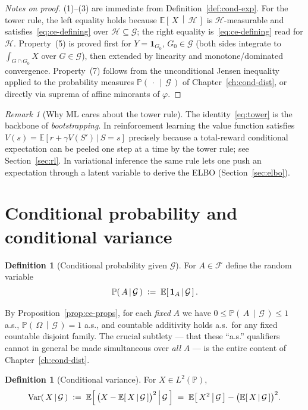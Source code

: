 \documentclass[11pt,oneside]{report}
\theoremstyle{plain}
\theoremstyle{definition}
\newtheorem{definition}[theorem]{Definition}
\theoremstyle{remark}
\newtheorem{remark}[theorem]{Remark}
\newcommand{\Prob}{\mathbb{P}}
\newcommand{\E}{\mathbb{E}}
\newcommand{\one}{\mathbf{1}}                 %
\newcommand{\Fcal}{\mathcal{F}}
\newcommand{\Gcal}{\mathcal{G}}
\newcommand{\Hcal}{\mathcal{H}}
\newcommand{\defeq}{\vcentcolon=}
\newcommand{\given}{\,\vert\,}
\DeclareMathOperator{\Var}{Var}
\newcommand{\cE}[2]{\E\!\left[\,#1 \,\middle|\, #2\,\right]}
\newcommand{\cProb}[2]{\Prob\!\left(\,#1 \,\middle|\, #2\,\right)}
\newcommand{\cVar}[2]{\Var\!\left(\,#1 \,\middle|\, #2\,\right)}
\numberwithin{equation}{chapter}
\begin{document}
\begin{proof}[Notes on proof]
(1)--(3) are immediate from Definition~\ref{def:cond-exp}. For the tower
rule, the left equality holds because $\cE{X}{\Hcal}$ is $\Hcal$-measurable
and satisfies~\eqref{eq:ce-defining} over $\Hcal\subseteq\Gcal$; the right
equality is~\eqref{eq:ce-defining} read for $\Hcal$. Property~(5) is proved
first for $Y=\one_{G_0}$, $G_0\in\Gcal$ (both sides integrate to
$\int_{G\cap G_0}X$ over $G\in\Gcal$), then extended by linearity and
monotone/dominated convergence. Property~(7) follows from the unconditional
Jensen inequality applied to the probability measures $\cProb{\cdot}{\Gcal}$
of Chapter~\ref{ch:cond-dist}, or directly via suprema of affine minorants
of $\varphi$.
\end{proof}

\begin{remark}[Why ML cares about the tower rule]
The identity~\eqref{eq:tower} is the backbone of \emph{bootstrapping}.
In reinforcement learning the value function satisfies
$V(s)=\E\!\left[r+\gamma V(S')\given S=s\right]$ precisely because a
total-reward conditional expectation can be peeled one step at a time by
the tower rule; see Section~\ref{sec:rl}. In variational inference the same
rule lets one push an expectation through a latent variable to derive the
ELBO (Section~\ref{sec:elbo}).
\end{remark}

\section{Conditional probability and conditional variance}

\begin{definition}[Conditional probability given $\Gcal$]\label{def:cond-prob-sigma}
For $A\in\Fcal$ define the random variable
\begin{equation}
  \cProb{A}{\Gcal}\;\defeq\;\cE{\one_A}{\Gcal}.
\end{equation}
\end{definition}

By Proposition~\ref{prop:ce-props}, for each \emph{fixed} $A$ we have
$0\le\cProb{A}{\Gcal}\le1$ a.s., $\cProb{\Omega}{\Gcal}=1$ a.s., and
countable additivity holds a.s.\ for any fixed countable disjoint family.
The crucial subtlety --- that these ``a.s.'' qualifiers cannot in general
be made simultaneous over \emph{all} $A$ --- is the entire content of
Chapter~\ref{ch:cond-dist}.

\begin{definition}[Conditional variance]\label{def:cond-var}
For $X\in L^2(\Prob)$,
\begin{equation}
  \cVar{X}{\Gcal}\;\defeq\;\cE{\bigl(X-\cE{X}{\Gcal}\bigr)^2}{\Gcal}
   \;=\;\cE{X^2}{\Gcal}-\bigl(\cE{X}{\Gcal}\bigr)^2 .
\end{equation}
\end{definition}
\end{document}
